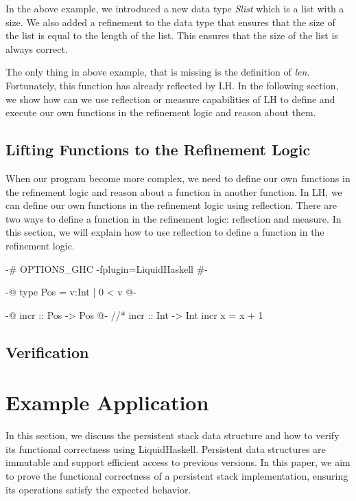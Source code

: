 \documentclass[]{rptuseminar}
\begin{document}
In the above example, we introduced a new data type \textit{Slist} which is a list with a size. 
We also added a refinement to the data type that ensures that the size of the list is equal to the length of the list. 
This ensures that the size of the list is always correct.

The only thing in above example, that is missing is the definition of \textit{len}. Fortunately, this function has already reflected by
LH. In the following section, we show how can we use reflection or measure capabilities of LH to define and execute our own functions in the refinement logic and
reason about them.

\subsection{Lifting Functions to the Refinement Logic}
When our program become more complex, we need to define our own functions in the refinement logic and reason about
a function in another function. In LH, we can define our own functions in the refinement logic using reflection.
There are two ways to define a function in the refinement logic: reflection and measure. In this section, we will explain how to use reflection to define a function in the refinement logic.
\begin{haskell}

\end{haskell}

\begin{haskell}
 {-# OPTIONS_GHC -fplugin=LiquidHaskell #-}

 {-@ type Pos = {v:Int | 0 < v} @-}

 {-@ incr :: Pos -> Pos @-} //*\label{srcline:typerefinement}
 incr :: Int -> Int
 incr x = x + 1 
\end{haskell}

\subsection{Verification}

\section{Example Application}

In this section, we discuss the persistent stack data structure and how to verify its functional correctness using LiquidHaskell. Persistent data structures are immutable and support efficient access to previous versions. In this paper, we aim to prove the functional correctness of a persistent stack implementation, ensuring its operations satisfy the expected behavior.
\end{document}
